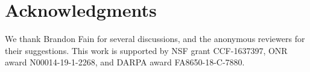 \documentclass{article}
\begin{document}










\section*{Acknowledgments}
We thank Brandon Fain for several discussions, and the anonymous reviewers for their suggestions. This work is supported by NSF grant CCF-1637397, ONR award N00014-19-1-2268, and DARPA award FA8650-18-C-7880.






\appendix

\end{document}

